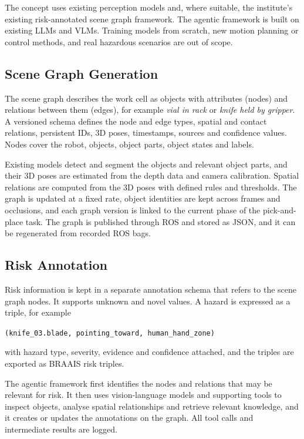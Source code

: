 The concept uses existing perception models and, where suitable, the
institute's existing risk-annotated scene graph framework. The agentic
framework is built on existing LLMs and VLMs. Training models from scratch,
new motion planning or control methods, and real hazardous scenarios are
out of scope.

\subsection{Scene Graph Generation}
\label{sec:scene-graph-generation}

The scene graph describes the work cell as objects with attributes (nodes)
and relations between them (edges), for example \emph{vial in rack} or
\emph{knife held by gripper}. A versioned schema defines the node and edge
types, spatial and contact relations, persistent IDs, 3D poses, timestamps,
sources and confidence values. Nodes cover the robot, objects, object
parts, object states and labels.

Existing models detect and segment the objects and relevant object parts,
and their 3D poses are estimated from the depth data and camera
calibration. Spatial relations are computed from the 3D poses with defined
rules and thresholds. The graph is updated at a fixed rate, object
identities are kept across frames and occlusions, and each graph version is
linked to the current phase of the pick-and-place task. The graph is
published through ROS and stored as JSON, and it can be regenerated from
recorded ROS bags.

\subsection{Risk Annotation}
\label{sec:risk-annotation}

Risk information is kept in a separate annotation schema that refers to the
scene graph nodes. It supports unknown and novel values. A hazard is
expressed as a triple, for example
\begin{center}
  \texttt{(knife\_03.blade, pointing\_toward, human\_hand\_zone)}
\end{center}
with hazard type, severity, evidence and confidence attached, and the
triples are exported as BRAAIS risk triples.

The agentic framework first identifies the nodes and relations that may be
relevant for risk. It then uses vision-language models and supporting tools
to inspect objects, analyse spatial relationships and retrieve relevant
knowledge, and it creates or updates the annotations on the graph. All tool
calls and intermediate results are logged.

